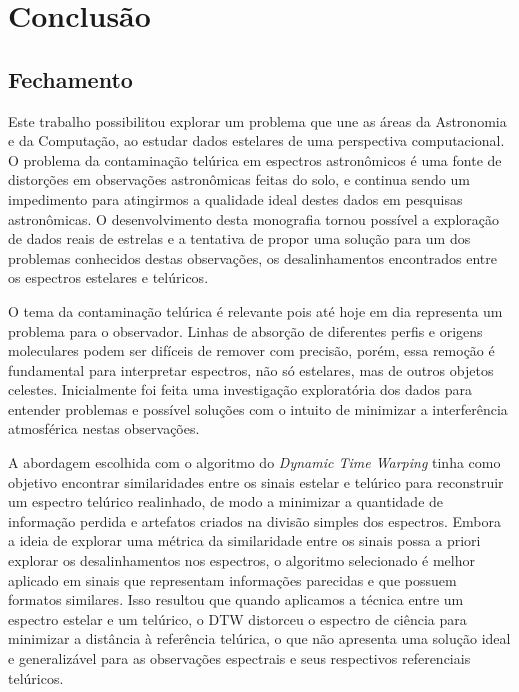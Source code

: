 \chapter{Conclusão}
\label{cap:conclusoes}

\section{Fechamento}

Este trabalho possibilitou explorar um problema que une as áreas da Astronomia e da Computação, ao estudar dados estelares de uma perspectiva computacional. O problema da contaminação telúrica em espectros astronômicos é uma fonte de distorções em observações astronômicas feitas do solo, e continua sendo um impedimento para atingirmos a qualidade ideal destes dados em pesquisas astronômicas. O desenvolvimento desta monografia tornou possível a exploração de dados reais de estrelas e a tentativa de propor uma solução para um dos problemas conhecidos destas observações, os desalinhamentos encontrados entre os espectros estelares e telúricos.  

O tema da contaminação telúrica é relevante pois até hoje em dia representa um problema para o observador. Linhas de absorção de diferentes perfis e origens moleculares podem ser difíceis de remover com precisão, porém, essa remoção é fundamental para interpretar espectros, não só estelares, mas de outros objetos celestes. Inicialmente foi feita uma investigação exploratória dos dados para entender problemas e possível soluções com o intuito de minimizar a interferência atmosférica nestas observações.

A abordagem escolhida com o algoritmo do \textit{Dynamic Time Warping} tinha como objetivo encontrar similaridades entre os sinais estelar e telúrico para reconstruir um espectro telúrico realinhado, de modo a minimizar a quantidade de informação perdida e artefatos criados na divisão simples dos espectros. Embora a ideia de explorar uma métrica da similaridade entre os sinais possa a priori explorar os desalinhamentos nos espectros, o algoritmo selecionado é melhor aplicado em sinais que representam informações parecidas e que possuem formatos similares. Isso resultou que quando aplicamos a técnica entre um espectro estelar e um telúrico, o DTW distorceu o espectro de ciência para minimizar a distância à referência telúrica, o que não apresenta uma solução ideal e generalizável para as observações espectrais e seus respectivos referenciais telúricos.   


